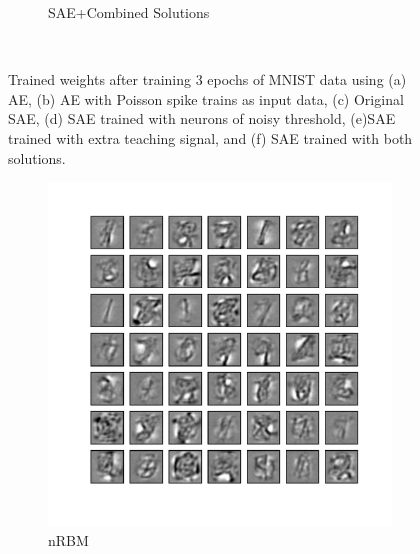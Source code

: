 \begin{figure}
\begin{subfigure}[t]{0.4\textwidth}
		\caption{SAE+Combined Solutions}
	\end{subfigure}\\
	\caption{Trained weights after training 3 epochs of MNIST data using (a) AE, (b) AE with Poisson spike trains as input data, (c) Original SAE, (d)  SAE trained with neurons of noisy threshold, (e)SAE trained with extra teaching signal, and (f) SAE trained with both solutions.}
	\label{fig:weights_ae}
\end{figure}

\begin{figure}
	\centering
	\begin{subfigure}[t]{0.4\textwidth}
		\includegraphics[width=\textwidth]{pics_sdlm/32_MNIST_RBM/2_60000_0.pdf}
		\caption{nRBM}
	\end{subfigure}
	\begin{subfigure}[t]{0.4\textwidth}

\end{subfigure}
\end{figure}
